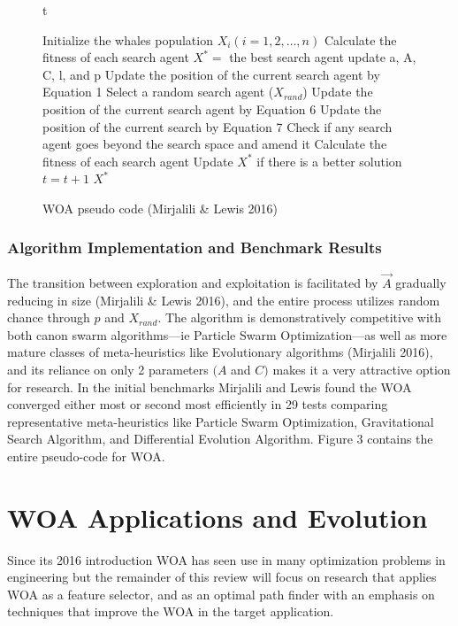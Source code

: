 \documentclass[11pt]{article}
\begin{document}
\begin{figure}{t}
	\caption{WOA pseudo code (Mirjalili \& Lewis 2016)}
	\begin{algorithm}[H]
		\scriptsize
		\begin{algorithmic}[1]
			\STATE Initialize the whales population $X_i(i = 1,2, \dots, n)$
			\STATE Calculate the fitness of each search agent
			\STATE $X^* = $ the best search agent
					\STATE update a, A, C, l, and p
							\STATE Update the position of the current search agent by Equation 1
						\ELSE
							\STATE Select a random search agent ($X_{rand}$)
							\STATE Update the position of the current search agent by Equation 6
						\ENDIF
					\ELSE
						\STATE Update the position of the current search by Equation 7
					\ENDIF
				\ENDFOR
				\STATE Check if any search agent goes beyond the search space and amend it
				\STATE Calculate the fitness of each search agent
				\STATE Update $X^*$ if there is a better solution
				\STATE $t = t+1$
			\ENDWHILE
			\STATE \RETURN $X^*$ 
		\end{algorithmic}
	\end{algorithm}
\end{figure}


\subsubsection*{Algorithm Implementation and Benchmark Results}
The transition between exploration and exploitation is facilitated by $\vec{A}$ gradually reducing in size (Mirjalili \& Lewis 2016), and the entire process utilizes random chance through $p$ and $X_{rand}$.
The algorithm is demonstratively competitive with both canon swarm algorithms---ie Particle Swarm Optimization---as well as more mature classes of meta-heuristics like Evolutionary algorithms (Mirjalili 2016), and its reliance on only 2 parameters $(A$ and $C)$ makes it a very attractive option for research.
In the initial benchmarks Mirjalili and Lewis found the WOA converged either most or second most efficiently in 29 tests comparing representative meta-heuristics like Particle Swarm Optimization, Gravitational Search Algorithm, and Differential Evolution Algorithm.
Figure 3 contains the entire pseudo-code for WOA.

\section*{WOA Applications and Evolution}
Since its 2016 introduction WOA has seen use in many optimization problems in engineering but the remainder of this review will focus on research that applies WOA as a feature selector, and as an optimal path finder with an emphasis on techniques that improve the WOA in the target application.
\end{document}
